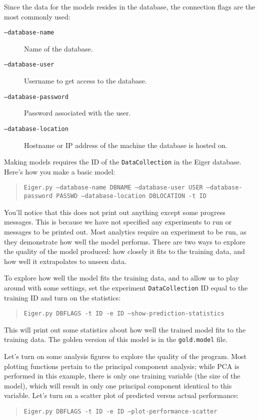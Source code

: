 Since the data for the models resides in the database, the connection flags are the most commonly used:
	\begin{description}
	\item[\texttt{--database-name}] Name of the database.
	\item[\texttt{--database-user}] Username to get access to the database.
	\item[\texttt{--database-password}] Password associated with the user.
	\item[\texttt{--database-location}] Hostname or IP address of the machine the database is hosted on.
	\end{description}
Making models requires the ID of the \texttt{DataCollection} in the Eiger database. Here's how you make a basic model:
	\begin{quote}
	\texttt{Eiger.py --database-name DBNAME --database-user USER --database-password PASSWD --database-location DBLOCATION -t ID}
	\end{quote}
You'll notice that this does not print out anything except some progress messages. This is because we have not specified any experiments to run or messages to be printed out. Most analytics require an experiment to be run, as they demonstrate how well the model performs. There are two ways to explore the quality of the model produced: how closely it fits to the training data, and how well it extrapolates to unseen data.

To explore how well the model fits the training data, and to allow us to play around with some settings, set the experiment \texttt{DataCollection} ID equal to the training ID and turn on the statistics:
	\begin{quote}
	\texttt{Eiger.py DBFLAGS -t ID -e ID --show-prediction-statistics}
	\end{quote}
This will print out some statistics about how well the trained model fits to the training data. The golden version of this model is in the \texttt{gold.model} file.

Let's turn on some analysis figures to explore the quality of the program. Most plotting functions pertain to the principal component analysis; while PCA is performed in this example, there is only one training variable (the size of the model), which will result in only one principal component identical to this variable. Let's turn on a scatter plot of predicted versus actual performance:
	\begin{quote}
	\texttt{Eiger.py DBFLAGS -t ID -e ID --plot-performance-scatter}
	\end{quote}

